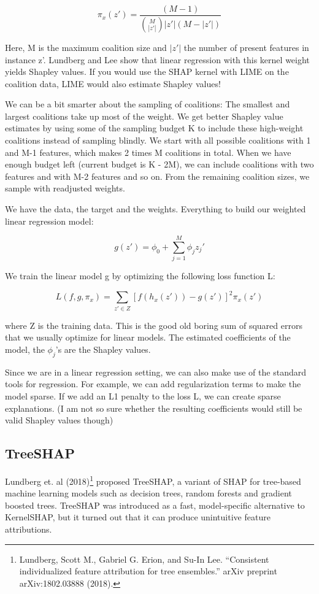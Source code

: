 \documentclass[12pt,]{krantz}
\begin{document}
\[\pi_{x}(z')=\frac{(M-1)}{\binom{M}{|z'|}|z'|(M-|z'|)}\]

Here, M is the maximum coalition size and \(|z'|\) the number of present
features in instance z'. Lundberg and Lee show that linear regression
with this kernel weight yields Shapley values. If you would use the SHAP
kernel with LIME on the coalition data, LIME would also estimate Shapley
values!

We can be a bit smarter about the sampling of coalitions: The smallest
and largest coalitions take up most of the weight. We get better Shapley
value estimates by using some of the sampling budget K to include these
high-weight coalitions instead of sampling blindly. We start with all
possible coalitions with 1 and M-1 features, which makes 2 times M
coalitions in total. When we have enough budget left (current budget is
K - 2M), we can include coalitions with two features and with M-2
features and so on. From the remaining coalition sizes, we sample with
readjusted weights.

We have the data, the target and the weights. Everything to build our
weighted linear regression model:

\[g(z')=\phi_0+\sum_{j=1}^M\phi_jz_j'\]

We train the linear model g by optimizing the following loss function L:

\[L(f,g,\pi_{x})=\sum_{z'\in{}Z}[f(h_x(z'))-g(z')]^2\pi_{x}(z')\]

where Z is the training data. This is the good old boring sum of squared
errors that we usually optimize for linear models. The estimated
coefficients of the model, the \(\phi_j\)'s are the Shapley values.

Since we are in a linear regression setting, we can also make use of the
standard tools for regression. For example, we can add regularization
terms to make the model sparse. If we add an L1 penalty to the loss L,
we can create sparse explanations. (I am not so sure whether the
resulting coefficients would still be valid Shapley values though)

\subsection{TreeSHAP}\label{treeshap}

Lundberg et. al (2018)\footnote{Lundberg, Scott M., Gabriel G. Erion,
  and Su-In Lee. ``Consistent individualized feature attribution for
  tree ensembles.'' arXiv preprint arXiv:1802.03888 (2018).} proposed
TreeSHAP, a variant of SHAP for tree-based machine learning models such
as decision trees, random forests and gradient boosted trees. TreeSHAP
was introduced as a fast, model-specific alternative to KernelSHAP, but
it turned out that it can produce unintuitive feature attributions.
\end{document}
